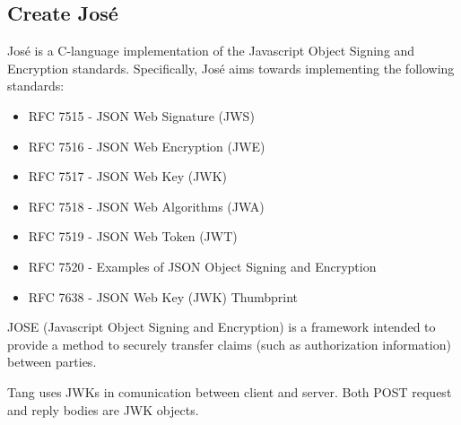 \newpage

\subsection{Create José}\label{jose}
José \cite{jose_prog} is a C-language implementation of the Javascript Object Signing and Encryption standards.
Specifically, José aims towards implementing the following standards:
\begin{itemize}
   \item RFC 7515 - JSON Web Signature (JWS)        \cite{RFC7515}
   \item RFC 7516 - JSON Web Encryption (JWE)       \cite{RFC7516}
   \item RFC 7517 - JSON Web Key (JWK)              \cite{RFC7517}
   \item RFC 7518 - JSON Web Algorithms (JWA)       \cite{RFC7518}
   \item RFC 7519 - JSON Web Token (JWT)            \cite{RFC7519}
   \item RFC 7520 - Examples of JSON Object Signing and Encryption \cite{RFC7520}
   \item RFC 7638 - JSON Web Key (JWK) Thumbprint   \cite{RFC7638}
\end{itemize}

JOSE (Javascript Object Signing and Encryption) is a framework intended to provide a method to securely transfer claims (such as authorization information) between parties.

Tang uses JWKs in comunication between client and server. Both POST request and reply bodies are JWK objects.

\newpage
